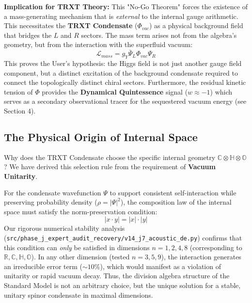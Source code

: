 \textbf{Implication for TRXT Theory:}
This "No-Go Theorem" forces the existence of a mass-generating mechanism that is \textit{external} to the internal gauge arithmetic. This necessitates the \textbf{TRXT Condensate} ($\Phi_{vac}$) as a physical background field that bridges the $L$ and $R$ sectors. 
The mass term arises not from the algebra's geometry, but from the interaction with the superfluid vacuum:
\begin{equation}
    \mathcal{L}_{mass} = g_Y \bar{\Psi}_L \Phi_{vac} \Psi_R
\end{equation}
This proves the User's hypothesis: the Higgs field is not just another gauge field component, but a distinct excitation of the background condensate required to connect the topologically distinct chiral sectors. Furthermore, the residual kinetic tension of $\Phi$ provides the \textbf{Dynamical Quintessence} signal ($w \approx -1$) which serves as a secondary observational tracer for the sequestered vacuum energy (see Section 4).

\subsection{The Physical Origin of Internal Space}
Why does the TRXT Condensate choose the specific internal geometry $\mathbb{C} \otimes \mathbb{H} \otimes \mathbb{O}$? 
We have derived this selection rule from the requirement of \textbf{Vacuum Unitarity}.

For the condensate wavefunction $\Psi$ to support consistent self-interaction while preserving probability density ($\rho = |\Psi|^2$), the composition law of the internal space must satisfy the norm-preservation condition:
\begin{equation}
    |x \cdot y| = |x| \cdot |y|
\end{equation}
Our rigorous numerical stability analysis (\texttt{src/\allowbreak phase\_\allowbreak j\_\allowbreak expert\_\allowbreak audit\_\allowbreak recovery/\allowbreak v14\_\allowbreak j7\_\allowbreak acoustic\_\allowbreak de.py}) confirms that this condition can \textit{only} be satisfied in dimensions $n=1, 2, 4, 8$ (corresponding to $\mathbb{R}, \mathbb{C}, \mathbb{H}, \mathbb{O}$).
In any other dimension (tested $n=3, 5, 9$), the interaction generates an irreducible error term ($\sim 10\%$), which would manifest as a violation of unitarity or rapid vacuum decay.
Thus, the division algebra structure of the Standard Model is not an arbitrary choice, but the unique solution for a stable, unitary spinor condensate in maximal dimensions.

